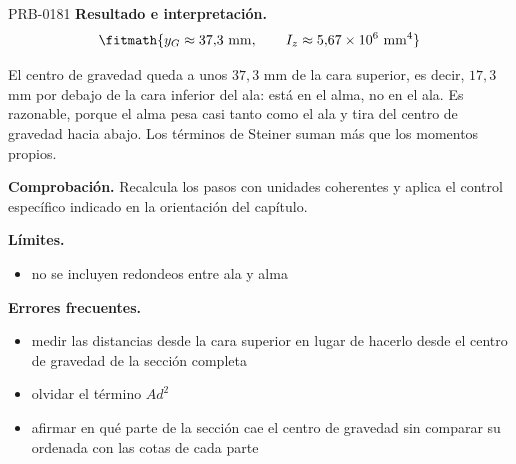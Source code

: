 \begin{studiumworked}{PRB-0181}
\textbf{Resultado e interpretación.}\[\fitmath{y_G \approx 37{,}3\ \mathrm{mm},\qquad I_z \approx 5{,}67\times 10^{6}\ \mathrm{mm}^{4}}\]

El centro de gravedad queda a unos $37{,}3$ mm de la cara superior, es decir, $17{,}3$ mm por debajo de la cara inferior del ala: está en el alma, no en el ala. Es razonable, porque el alma pesa casi tanto como el ala y tira del centro de gravedad hacia abajo. Los términos de Steiner suman más que los momentos propios.

\par\textbf{Comprobación.} Recalcula los pasos con unidades coherentes y aplica el control específico indicado en la orientación del capítulo.

\textbf{Límites.}\begin{itemize}\item no se incluyen redondeos entre ala y alma\end{itemize}

\textbf{Errores frecuentes.}\begin{itemize}\item medir las distancias desde la cara superior en lugar de hacerlo desde el centro de gravedad de la sección completa
\item olvidar el término $A d^2$
\item afirmar en qué parte de la sección cae el centro de gravedad sin comparar su ordenada con las cotas de cada parte\end{itemize}

\end{studiumworked}

\Needspace{.3\textheight}

